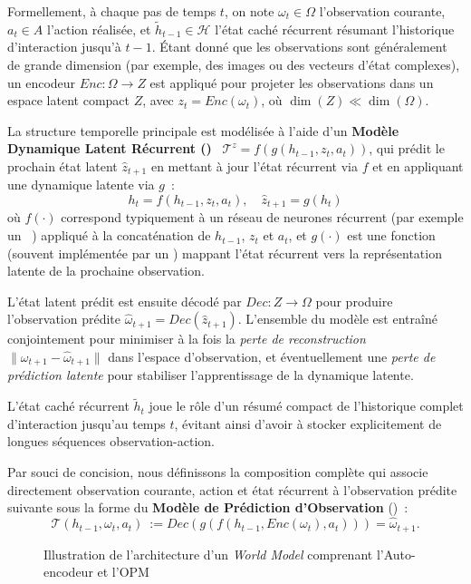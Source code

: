 Formellement, à chaque pas de temps $t$, on note $\omega_t \in \Omega$ l'observation courante, $a_t \in A$ l'action réalisée, et $\tilde{h}_{t-1} \in \mathcal{H}$ l'état caché récurrent résumant l'historique d'interaction jusqu'à $t-1$. Étant donné que les observations sont généralement de grande dimension (par exemple, des images ou des vecteurs d'état complexes), un encodeur $Enc: \Omega \rightarrow Z$ est appliqué pour projeter les observations dans un espace latent compact $Z$, avec $z_t = Enc(\omega_t)$, où $\dim(Z) \ll \dim(\Omega)$.

La structure temporelle principale est modélisée à l'aide d'un \textbf{Modèle Dynamique Latent Récurrent ()}~\cite{hafner2020dream} $\mathcal{T}^{z} = f(g(h_{t-1}, z_t, a_t))$, qui prédit le prochain état latent $\hat{z}_{t+1}$ en mettant à jour l'état récurrent via $f$ et en appliquant une dynamique latente via $g$~:
\[
  h_t = f(h_{t-1}, z_t, a_t), \quad \hat{z}_{t+1} = g(h_t)
\]
où $f(\cdot)$ correspond typiquement à un réseau de neurones récurrent (par exemple un ~\cite{hochreiter1997long}) appliqué à la concaténation de $h_{t-1}$, $z_t$ et $a_t$, et $g(\cdot)$ est une fonction (souvent implémentée par un ) mappant l'état récurrent vers la représentation latente de la prochaine observation.

L'état latent prédit est ensuite décodé par $Dec: Z \rightarrow \Omega$ pour produire l'observation prédite $\hat{\omega}_{t+1} = Dec(\hat{z}_{t+1})$. L'ensemble du modèle est entraîné conjointement pour minimiser à la fois la \emph{perte de reconstruction} $\|\omega_{t+1} - \hat{\omega}_{t+1}\|$ dans l'espace d'observation, et éventuellement une \emph{perte de prédiction latente} pour stabiliser l'apprentissage de la dynamique latente.

L'état caché récurrent $\tilde{h}_t$ joue le rôle d'un résumé compact de l'historique complet d'interaction jusqu'au temps $t$, évitant ainsi d'avoir à stocker explicitement de longues séquences observation-action.

Par souci de concision, nous définissons la composition complète qui associe directement observation courante, action et état récurrent à l'observation prédite suivante sous la forme du \textbf{Modèle de Prédiction d'Observation} ()~:
\[
  \mathcal{T}(h_{t-1}, \omega_t, a_t)~:= Dec(g(f(h_{t-1}, Enc(\omega_t), a_t))) = \hat{\omega}_{t+1}.
\]

\begin{figure}[h!]
  \centering
  \resizebox{\textwidth}{!}{%
    
  }
  \caption{Illustration de l'architecture d'un \textit{World Model} comprenant l'Auto-encodeur et l'OPM}
  \label{fig:single_agent_world_model}
\end{figure}

